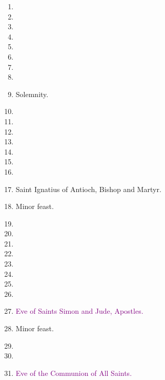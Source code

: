 		\begin{enumerate}
			\item %
			\item %
			\item %
			\item %
			\item %
			\item %
			\item %
			\item %
			\item {} Solemnity.
			\item %
			\item %
			\item %
			\item %
			\item %
			\item %
			\item %
			\item Saint Ignatius of Antioch, Bishop and Martyr. 
			\item {} Minor feast.
			\item %
			\item %
			\item %
			\item %
			\item %
			\item %
			\item %
			\item %
			\item \textcolor{purple}{Eve of Saints Simon and Jude, Apostles.}
			\item {} Minor feast.
			\item %
			\item %
			\item \textcolor{purple}{Eve of the Communion of All Saints.}
		\end{enumerate}
	
	
